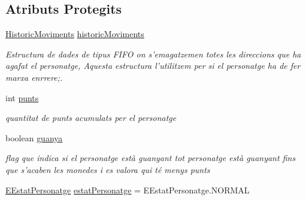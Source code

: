 \subsection*{Atributs Protegits}
\begin{DoxyCompactItemize}
\item 
\hypertarget{classlogica_1_1_personatge_a86322efbc950e2954fe2a8cde806bbd9}{\hyperlink{classlogica_1_1historic__moviments_1_1_historic_moviments}{Historic\+Moviments} \hyperlink{classlogica_1_1_personatge_a86322efbc950e2954fe2a8cde806bbd9}{historic\+Moviments}}\label{classlogica_1_1_personatge_a86322efbc950e2954fe2a8cde806bbd9}

\begin{DoxyCompactList}\small\item\em Estructura de dades de tipus F\+I\+F\+O on s'emagatzemen totes les direccions que ha agafat el personatge, Aquesta estructura l'utilitzem per si el personatge ha de fer marxa enrrere;. \end{DoxyCompactList}\item 
\hypertarget{classlogica_1_1_personatge_a2a46aceef25eeae45072cf2e6ece1506}{int \hyperlink{classlogica_1_1_personatge_a2a46aceef25eeae45072cf2e6ece1506}{punts}}\label{classlogica_1_1_personatge_a2a46aceef25eeae45072cf2e6ece1506}

\begin{DoxyCompactList}\small\item\em quantitat de punts acumulats per el personatge \end{DoxyCompactList}\item 
\hypertarget{classlogica_1_1_personatge_a0c30dc6ca85f941043ae4a27e7583c67}{boolean \hyperlink{classlogica_1_1_personatge_a0c30dc6ca85f941043ae4a27e7583c67}{guanya}}\label{classlogica_1_1_personatge_a0c30dc6ca85f941043ae4a27e7583c67}

\begin{DoxyCompactList}\small\item\em flag que indica si el personatge està guanyant tot personatge està guanyant fins que s'acaben les monedes i es valora qui té menys punts \end{DoxyCompactList}\item 
\hypertarget{classlogica_1_1_personatge_ac9325217d5c36660a38dd20eb240b278}{\hyperlink{enumlogica_1_1_personatge_1_1_e_estat_personatge}{E\+Estat\+Personatge} \hyperlink{classlogica_1_1_personatge_ac9325217d5c36660a38dd20eb240b278}{estat\+Personatge} = E\+Estat\+Personatge.\+N\+O\+R\+M\+A\+L}\label{classlogica_1_1_personatge_ac9325217d5c36660a38dd20eb240b278}


\end{DoxyCompactItemize}
